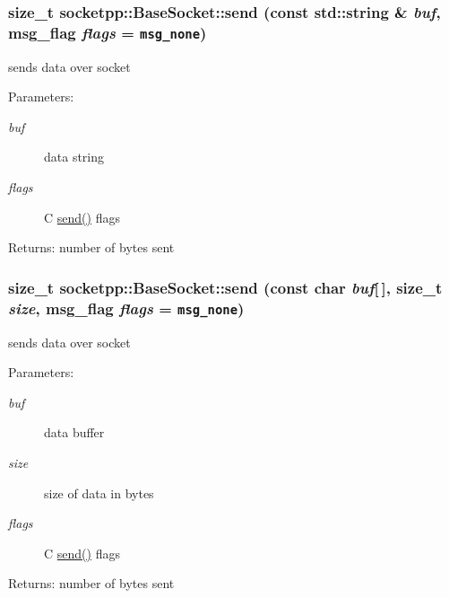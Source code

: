 \begin{CompactItemize}
{\subsubsection[{send}]{\setlength{\rightskip}{0pt plus 5cm}size\_\-t socketpp::BaseSocket::send (const std::string \& {\em buf}, \/  msg\_\-flag {\em flags} = {\tt msg\_\-none})}}
\label{classsocketpp_1_1BaseSocket_8a5fa7a9374964d7978285a003301b9d}


sends data over socket 

\begin{Desc}
\item[Parameters:]
\begin{description}
\item[{\em buf}]data string \item[{\em flags}]C \hyperlink{classsocketpp_1_1BaseSocket_a63e58c917c6be09f641f9ff1830e74a}{send()} flags \end{description}
\end{Desc}
\begin{Desc}
\item[Returns:]number of bytes sent \end{Desc}
\hypertarget{classsocketpp_1_1BaseSocket_a63e58c917c6be09f641f9ff1830e74a}{
\subsubsection[{send}]{\setlength{\rightskip}{0pt plus 5cm}size\_\-t socketpp::BaseSocket::send (const char {\em buf}\mbox{[}$\,$\mbox{]}, \/  size\_\-t {\em size}, \/  msg\_\-flag {\em flags} = {\tt msg\_\-none})}}
\label{classsocketpp_1_1BaseSocket_a63e58c917c6be09f641f9ff1830e74a}


sends data over socket 

\begin{Desc}
\item[Parameters:]
\begin{description}
\item[{\em buf}]data buffer \item[{\em size}]size of data in bytes \item[{\em flags}]C \hyperlink{classsocketpp_1_1BaseSocket_a63e58c917c6be09f641f9ff1830e74a}{send()} flags \end{description}
\end{Desc}
\begin{Desc}
\item[Returns:]number of bytes sent \end{Desc}
\hypertarget{classsocketpp_1_1BaseSocket_1bcaa3e5552273e0ef51811bd6987dc8}{
}
\end{CompactItemize}

